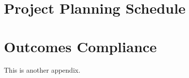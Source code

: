 \chapter{Project Planning Schedule}
\makeatletter{}\makeatother
\label{appen:derivations_bigramseg}



\chapter{Outcomes Compliance}
\makeatletter{}\makeatother
\label{appen:derivations_bigramseg}

This is another appendix.
